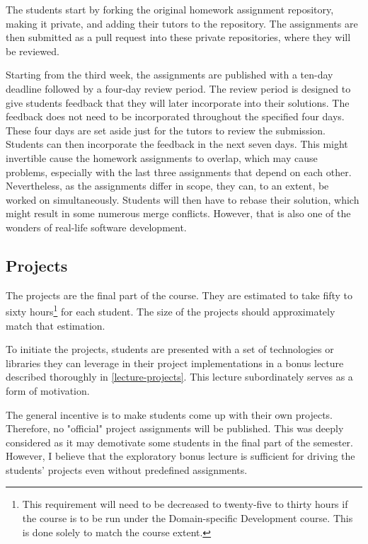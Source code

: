 \documentclass[
  digital,
  color,
  oneside,
  nosansbold,
  nocolorbold,
  nolof,
  nolot,
]{fithesis4}
\begin{document}
The students start by forking the original homework assignment repository, making it private, and adding their tutors to the repository. The assignments are then submitted as a pull request into these private repositories, where they will be reviewed.

Starting from the third week, the assignments are published with a ten-day deadline followed by a four-day review period. The review period is designed to give students feedback that they will later incorporate into their solutions. The feedback does not need to be incorporated throughout the specified four days. These four days are set aside just for the tutors to review the submission. Students can then incorporate the feedback in the next seven days. This might invertible cause the homework assignments to overlap, which may cause problems, especially with the last three assignments that depend on each other. Nevertheless, as the assignments differ in scope, they can, to an extent, be worked on simultaneously. Students will then have to rebase their solution, which might result in some numerous merge conflicts. However, that is also one of the wonders of real-life software development.

\subsection{Projects}\label{design-projects}

The projects are the final part of the course. They are estimated to take fifty to sixty hours\footnote{This requirement will need to be decreased to twenty-five to thirty hours if the course is to be run under the Domain-specific Development course. This is done solely to match the course extent.} for each student. The size of the projects should approximately match that estimation.

To initiate the projects, students are presented with a set of technologies or libraries they can leverage in their project implementations in a bonus lecture described thoroughly in \cref{lecture-projects}. This lecture subordinately serves as a form of motivation.

The general incentive is to make students come up with their own projects. Therefore, no "official" project assignments will be published. This was deeply considered as it may demotivate some students in the final part of the semester. However, I believe that the exploratory bonus lecture is sufficient for driving the students' projects even without predefined assignments.
\end{document}

